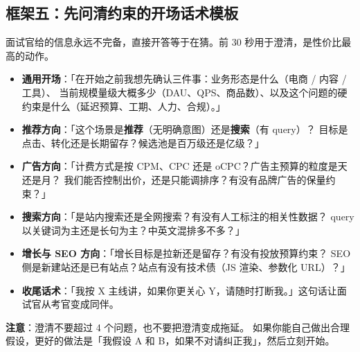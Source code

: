 \subsection{框架五：先问清约束的开场话术模板}

面试官给的信息永远不完备，直接开答等于在猜。前 30 秒用于澄清，是性价比最高的动作。

\begin{interview}
\begin{itemize}
  \item \textbf{通用开场}：「在开始之前我想先确认三件事：业务形态是什么（电商 / 内容 / 工具）、
        当前规模量级大概多少（DAU、QPS、商品数）、以及这个问题的硬约束是什么（延迟预算、工期、人力、合规）。」
  \item \textbf{推荐方向}：「这个场景是\textbf{推荐}（无明确意图）还是\textbf{搜索}（有 query）？
        目标是点击、转化还是长期留存？候选池是百万级还是亿级？」
  \item \textbf{广告方向}：「计费方式是按 CPM、CPC 还是 oCPC？广告主预算的粒度是天还是月？
        我们能否控制出价，还是只能调排序？有没有品牌广告的保量约束？」
  \item \textbf{搜索方向}：「是站内搜索还是全网搜索？有没有人工标注的相关性数据？
        query 以关键词为主还是长句为主？中英文混排多不多？」
  \item \textbf{增长与 SEO 方向}：「增长目标是拉新还是留存？有没有投放预算约束？
        SEO 侧是新建站还是已有站点？站点有没有技术债（JS 渲染、参数化 URL）？」
  \item \textbf{收尾话术}：「我按 X 主线讲，如果你更关心 Y，请随时打断我。」这句话让面试官从考官变成同伴。
\end{itemize}
\textbf{注意}：澄清不要超过 4 个问题，也不要把澄清变成拖延。
如果你能自己做出合理假设，更好的做法是「我假设 A 和 B，如果不对请纠正我」，然后立刻开始。
\end{interview}

